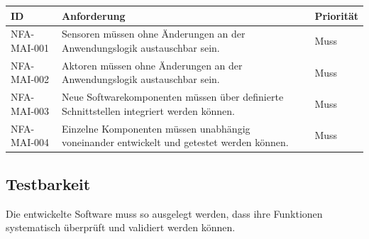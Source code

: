 \begin{longtable}[]{@{}
  >{\raggedright\arraybackslash}p{}
  >{\raggedright\arraybackslash}p{}
  >{\raggedright\arraybackslash}p{}@{}}
\toprule\noalign{}
\begin{minipage}[b]{\linewidth}\raggedright
ID
\end{minipage} & \begin{minipage}[b]{\linewidth}\raggedright
Anforderung
\end{minipage} & \begin{minipage}[b]{\linewidth}\raggedright
Priorität
\end{minipage} \\
\midrule\noalign{}
\endhead
\bottomrule\noalign{}
\endlastfoot
NFA-MAI-001 & Sensoren müssen ohne Änderungen an der Anwendungslogik
austauschbar sein. & Muss \\
NFA-MAI-002 & Aktoren müssen ohne Änderungen an der Anwendungslogik
austauschbar sein. & Muss \\
NFA-MAI-003 & Neue Softwarekomponenten müssen über definierte
Schnittstellen integriert werden können. & Muss \\
NFA-MAI-004 & Einzelne Komponenten müssen unabhängig voneinander
entwickelt und getestet werden können. & Muss \\
\end{longtable}

\subsection{Testbarkeit}\label{testbarkeit}

Die entwickelte Software muss so ausgelegt werden, dass ihre Funktionen
systematisch überprüft und validiert werden können.

